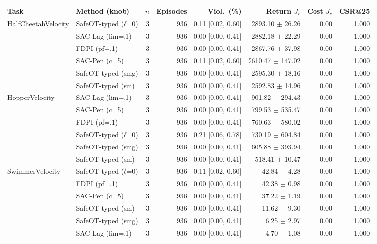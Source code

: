 \begin{tabular}{llrrrrrr}
\toprule
Task & Method (knob) & $n$ & Episodes & Viol.\ (\%) & Return $J_r$ & Cost $J_c$ & CSR@25 \\
\midrule
HalfCheetahVelocity & SafeOT-typed ($\delta$=0) & 3 & 936 & 0.11 [0.02, 0.60] & 2893.10 $\pm$ 26.26 & 0.00 & 1.000 \\
 & SAC-Lag (lim=.1) & 3 & 936 & 0.00 [0.00, 0.41] & 2882.18 $\pm$ 22.29 & 0.00 & 1.000 \\
 & FDPI (pf=.1) & 3 & 936 & 0.00 [0.00, 0.41] & 2867.76 $\pm$ 37.98 & 0.00 & 1.000 \\
 & SAC-Pen (c=5) & 3 & 936 & 0.11 [0.02, 0.60] & 2610.47 $\pm$ 147.02 & 0.00 & 1.000 \\
 & SafeOT-typed (smg) & 3 & 936 & 0.00 [0.00, 0.41] & 2595.30 $\pm$ 18.16 & 0.00 & 1.000 \\
 & SafeOT-typed (sm) & 3 & 936 & 0.00 [0.00, 0.41] & 2592.83 $\pm$ 14.96 & 0.00 & 1.000 \\
\midrule
HopperVelocity & SAC-Lag (lim=.1) & 3 & 936 & 0.00 [0.00, 0.41] & 901.82 $\pm$ 294.43 & 0.00 & 1.000 \\
 & SAC-Pen (c=5) & 3 & 936 & 0.00 [0.00, 0.41] & 799.53 $\pm$ 535.47 & 0.00 & 1.000 \\
 & FDPI (pf=.1) & 3 & 936 & 0.00 [0.00, 0.41] & 760.63 $\pm$ 580.02 & 0.00 & 1.000 \\
 & SafeOT-typed ($\delta$=0) & 3 & 936 & 0.21 [0.06, 0.78] & 730.19 $\pm$ 604.84 & 0.00 & 1.000 \\
 & SafeOT-typed (smg) & 3 & 936 & 0.00 [0.00, 0.41] & 605.88 $\pm$ 393.94 & 0.00 & 1.000 \\
 & SafeOT-typed (sm) & 3 & 936 & 0.00 [0.00, 0.41] & 518.41 $\pm$ 10.47 & 0.00 & 1.000 \\
\midrule
SwimmerVelocity & SafeOT-typed ($\delta$=0) & 3 & 936 & 0.11 [0.02, 0.60] & 42.84 $\pm$ 4.28 & 0.00 & 1.000 \\
 & FDPI (pf=.1) & 3 & 936 & 0.00 [0.00, 0.41] & 42.38 $\pm$ 0.98 & 0.00 & 1.000 \\
 & SAC-Pen (c=5) & 3 & 936 & 0.00 [0.00, 0.41] & 37.22 $\pm$ 1.19 & 0.00 & 1.000 \\
 & SafeOT-typed (sm) & 3 & 936 & 0.00 [0.00, 0.41] & 11.62 $\pm$ 9.30 & 0.00 & 1.000 \\
 & SafeOT-typed (smg) & 3 & 936 & 0.00 [0.00, 0.41] & 6.25 $\pm$ 2.97 & 0.00 & 1.000 \\
 & SAC-Lag (lim=.1) & 3 & 936 & 0.00 [0.00, 0.41] & 4.70 $\pm$ 1.08 & 0.00 & 1.000 \\

\end{tabular}
